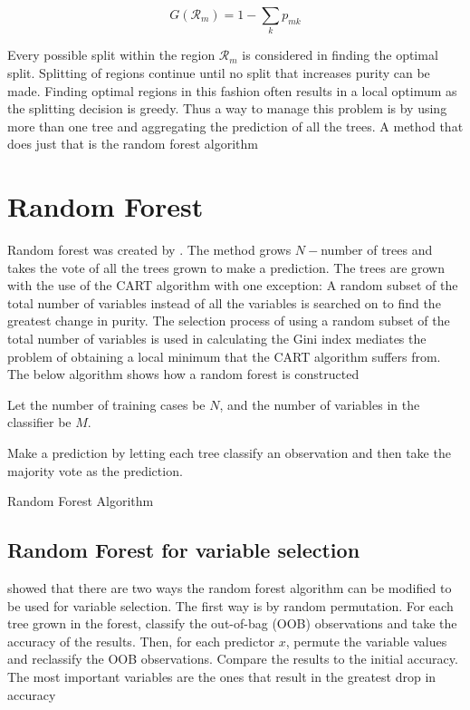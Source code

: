 \documentclass[twoside,11pt]{article}
\begin{document}
\begin{equation}
	G(\mathcal{R}_m)= 1-\displaystyle\sum_k p_{mk}
\end{equation}

Every possible split within the region $\mathcal{R}_m$ is considered in finding the optimal split. Splitting of regions continue until no split that increases purity can be made. Finding optimal regions in this fashion often results in a local optimum as the splitting decision is greedy. Thus a way to manage this problem is by using more than one tree and aggregating the prediction of all the trees. A method that does just that is the random forest algorithm

\section{Random Forest}
Random forest was created by \citet{Breiman01}. The method grows $N-$number of trees and takes the vote of all the trees grown to make a prediction. The trees are grown with the use of the CART algorithm with one exception: A random subset of the total number of variables instead of all the variables is searched on to find the greatest change in purity. The selection process of using a random subset of the total number of variables is used in calculating the Gini index mediates the problem of obtaining a local minimum that the CART algorithm suffers from. The below algorithm shows how a random forest is constructed

\begin{algorithm}
Let the number of training cases be $N$, and the number of variables in the classifier be $M$.

Make a prediction by letting each tree classify an observation and then take the majority vote as the prediction.
\caption{Random Forest Algorithm}\label{algo: RandomForest}
\end{algorithm}

\subsection{Random Forest for variable selection}
\citet{Breiman01} showed that there are two ways the random forest algorithm can be modified to be used for variable selection. The first way is by random permutation. For each tree grown in the forest, classify the out-of-bag (OOB) observations and take the accuracy of the results. Then, for each predictor $x$, permute the variable values and reclassify the OOB observations. Compare the results to the initial accuracy. The most important variables are the ones that result in the greatest drop in accuracy
\end{document}
